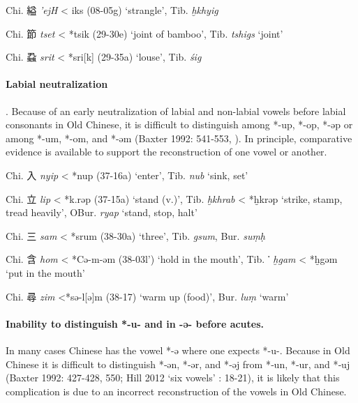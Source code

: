 \begin{description} \item
Chi. 縊 \emph{'ejH} \textless{} {}iks (08-05g) `strangle', Tib. {} \emph{ḫkhyig}

\item
Chi. 節 \emph{tset} \textless{} *ts{}ik (29-30e) `joint of bamboo', Tib. {} \emph{tshigs} `joint'

\item
Chi. 蝨 \emph{srit} \textless{} *sri{[}k] (29-35a) `louse', Tib. {} \emph{śig}
\end{description}

\paragraph{Labial neutralization}. Because of
an early neutralization of labial and non-labial vowels before labial
consonants in Old Chinese, it is difficult to distinguish among *-up,
*-op, *-əp or among *-um, *-om, and *-əm (Baxter 1992: 541-553, 
\cite[306]{Baxter2014OldChinese}). In principle, comparative evidence is available to
support the reconstruction of one vowel or another.

\begin{description} \item
Chi. 入 \emph{nyip} \textless{} *nup (37-16a) `enter', Tib. {} \emph{nub} `sink, set'

\item
Chi. 立 \emph{lip} \textless{} *k.rəp (37-15a) `stand (v.)', Tib. {} \emph{ḫkhrab} \textless{} *ḫkrəp `strike, stamp, tread heavily', OBur. {} \emph{ryap} `stand, stop, halt'

\item
Chi. 三 \emph{sam} \textless{} *srum (38-30a) `three', Tib. {} \emph{gsum}, Bur. {} \emph{suṃḥ}

\item
Chi. 含 \emph{hom} \textless{} *Cə-m-{}əm (38-03l') `hold in the mouth',
Tib. {}་ \emph{ḫgam} \textless{} *ḫgəm `put in the mouth'

\item
Chi. 尋 \emph{zim} \textless{}*sə-l{[}ə]m (38-17) `warm up (food)',
Bur. {} \emph{luṃ} `warm'
\end{description}

\paragraph{Inability to distinguish *-u- and
in -ə- before acutes.} In many cases Chinese
has the vowel *-ə where one expects *-u-. Because in Old
Chinese it is difficult to distinguish *‑ən, *‑ər, and *‑əj
from *‑un, *‑ur, and *‑uj (Baxter 1992: 427-428, 550; Hill 2012 `six
vowels' : 18-21), it is likely that this complication is due to an
incorrect reconstruction of the vowels in Old Chinese. 

